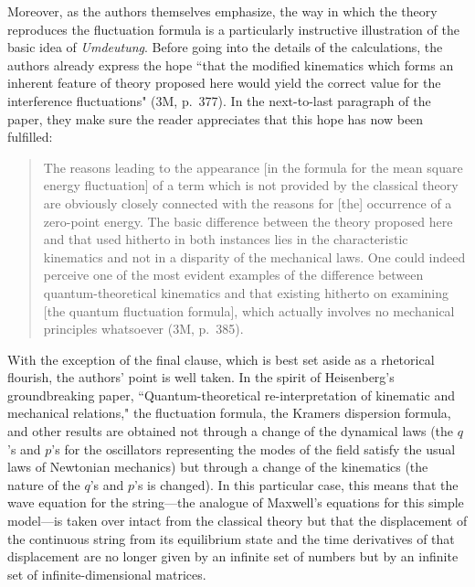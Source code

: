\documentclass[12pt]{elsart}
\begin{document}
Moreover, as the authors themselves emphasize, the way in which the theory reproduces the fluctuation formula is a particularly instructive illustration of the basic idea of {\it Umdeutung}. Before going into the details of the calculations, the authors already express the hope ``that the modified kinematics which forms an inherent feature of theory proposed here would yield the correct value for the interference fluctuations" (3M, p.\ 377). In the next-to-last paragraph of the paper, they make sure the reader appreciates that this hope has now been fulfilled:
\begin{quotation}
The reasons leading to the appearance [in the formula for the mean square energy fluctuation] of a term which is not provided by the classical theory are obviously closely connected with the reasons for [the] occurrence of a zero-point energy. The basic difference between the theory proposed here and that used hitherto in both instances lies in
the characteristic kinematics and not in a disparity of the mechanical laws. One could
indeed perceive one of the most evident examples of the difference between quantum-theoretical
kinematics and that existing hitherto on examining [the quantum fluctuation
formula], which actually involves no mechanical principles whatsoever (3M, p.\ 385).
\end{quotation}
With the exception of the final clause, which is best set aside as a rhetorical flourish, the authors' point is well taken. In the spirit of Heisenberg's groundbreaking paper, ``Quantum-theoretical re-interpretation of kinematic and mechanical relations," the fluctuation formula, the Kramers dispersion formula, and other results are obtained not through a change of the dynamical laws (the $q$'s and $p$'s for the oscillators representing the modes of the field satisfy the usual laws of Newtonian mechanics) but through a change of the kinematics (the nature of the $q$'s and $p$'s is changed).  In this particular case, this means that the wave equation for the string---the analogue of Maxwell's equations for this simple model---is taken over intact from the classical theory but that the displacement of the continuous string from its equilibrium state and the time derivatives of that displacement are no longer given by an infinite set of numbers but by an infinite set of infinite-dimensional matrices. 
\end{document}
